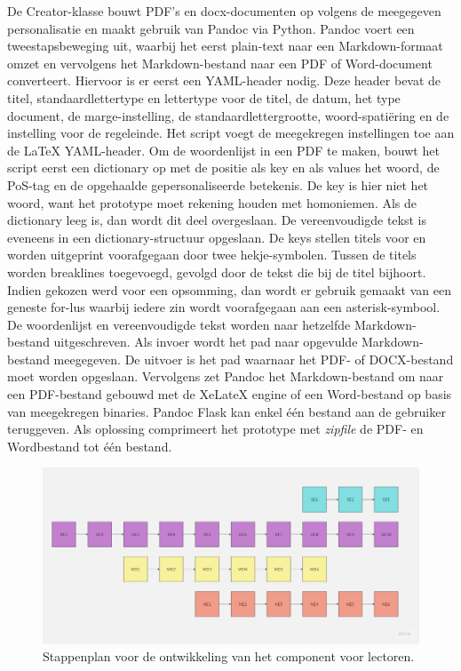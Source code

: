 De Creator-klasse bouwt PDF's en docx-documenten op volgens de meegegeven personalisatie en maakt gebruik van Pandoc via Python. Pandoc voert een tweestapsbeweging uit, waarbij het eerst plain-text naar een Markdown-formaat omzet en vervolgens het Markdown-bestand naar een PDF of Word-document converteert. Hiervoor is er eerst een YAML-header nodig. Deze header bevat de titel, standaardlettertype en lettertype voor de titel, de datum, het type document, de marge-instelling, de standaardlettergrootte, woord-spatiëring en de instelling voor de regeleinde. Het script voegt de meegekregen instellingen toe aan de LaTeX YAML-header. Om de woordenlijst in een PDF te maken, bouwt het script eerst een dictionary op met de positie als key en als values het woord, de PoS-tag en de opgehaalde gepersonaliseerde betekenis. De key is hier niet het woord, want het prototype moet rekening houden met homoniemen. Als de dictionary leeg is, dan wordt dit deel overgeslaan. De vereenvoudigde tekst is eveneens in een dictionary-structuur opgeslaan. De keys stellen titels voor en worden uitgeprint voorafgegaan door twee hekje-symbolen. Tussen de titels worden breaklines toegevoegd, gevolgd door de tekst die bij de titel bijhoort. Indien gekozen werd voor een opsomming, dan wordt er gebruik gemaakt van een geneste for-lus waarbij iedere zin wordt voorafgegaan aan een asterisk-symbool. De woordenlijst en vereenvoudigde tekst worden naar hetzelfde Markdown-bestand uitgeschreven. Als invoer wordt het pad naar opgevulde Markdown-bestand meegegeven. De uitvoer is het pad waarnaar het PDF- of DOCX-bestand moet worden opgeslaan. Vervolgens zet Pandoc het Markdown-bestand om naar een PDF-bestand gebouwd met de XeLateX engine of een Word-bestand op basis van meegekregen binaries. Pandoc Flask kan enkel één bestand aan de gebruiker teruggeven. Als oplossing comprimeert het prototype met \textit{zipfile} de PDF- en Wordbestand tot één bestand. 

\begin{figure}[H]
	\includegraphics[width=\linewidth]{img/flowchart-development.jpg}
	\caption{Stappenplan voor de ontwikkeling van het component voor lectoren.}
	\label{img:stappenplan-leerkrachten}
\end{figure}

